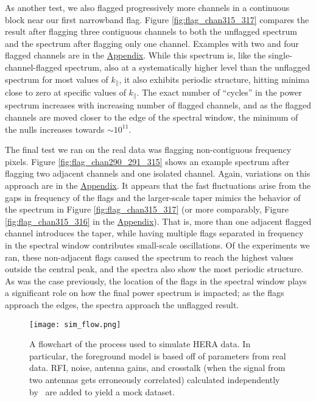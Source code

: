 \documentclass[12pt]{article}
\begin{document}
As another test, we also flagged progressively more channels in a continuous block near our first narrowband flag. Figure \ref{fig:flag_chan315_317} compares the result after flagging three contiguous channels to both the unflagged spectrum and the spectrum after flagging only one channel. Examples with two and four flagged channels are in the \hyperlink{appendix}{Appendix}. While this spectrum is, like the single-channel-flagged spectrum, also at a systematically higher level than the unflagged spectrum for most values of $k_\parallel$, it also exhibits periodic structure, hitting minima close to zero at specific values of $k_\parallel$. The exact number of ``cycles'' in the power spectrum increases with increasing number of flagged channels, and as the flagged channels are moved closer to the edge of the spectral window, the minimum of the nulls increases towards $\sim 10^{11}$.

The final test we ran on the real data was flagging non-contiguous frequency pixels. Figure \ref{fig:flag_chan290_291_315} shows an example spectrum after flagging two adjacent channels and one isolated channel. Again, variations on this approach are in the \hyperlink{appendix}{Appendix}. It appears that the fast fluctuations arise from the gaps in frequency of the flags and the larger-scale taper mimics the behavior of the spectrum in Figure \ref{fig:flag_chan315_317} (or more comparably, Figure \ref{fig:flag_chan315_316} in the \hyperlink{appendix}{Appendix}). That is, more than one adjacent flagged channel introduces the taper, while having multiple flags separated in frequency in the spectral window contributes small-scale oscillations. Of the experiments we ran, these non-adjacent flags caused the spectrum to reach the highest values outside the central peak, and the spectra also show the most periodic structure. As was the case previously, the location of the flags in the spectral window plays a significant role on how the final power spectrum is impacted; as the flags approach the edges, the spectra approach the unflagged result. \vspace{3mm}

\begin{figure}[t]
	\centering
	\texttt{[image: sim\_flow.png]}
	\caption[Flowchart of the process of modelling HERA data]{A flowchart of the process used to simulate HERA data. In particular, the foreground model is based off of parameters from real data. RFI, noise, antenna gains, and crosstalk (when the signal from two antennas gets erroneously correlated) calculated independently by \herasim~are added to yield a mock dataset.}
	\label{fig:sim_flow}
\end{figure}
\end{document}
